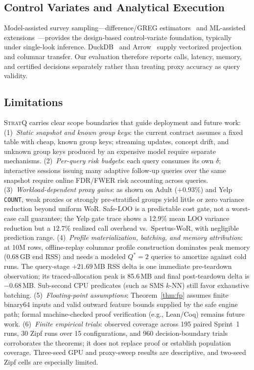 \subsection{Control Variates and Analytical Execution}
Model-assisted survey sampling---difference/GREG estimators~\cite{sarndal1992model} and ML-assisted extensions~\cite{breidt2017modelassisted}---provides the design-based control-variate foundation, typically under single-look inference. DuckDB~\cite{raasveldt2019duckdb} and Arrow~\cite{apachearrow} supply vectorized projection and columnar transfer. Our evaluation therefore reports calls, latency, memory, and certified decisions separately rather than treating proxy accuracy as query validity.

\subsection{Limitations}
\label{sec:limitations}

\textsc{StratQ} carries clear scope boundaries that guide deployment and future work:
(1)~\emph{Static snapshot and known group keys}: the current contract assumes a fixed table with cheap, known group keys; streaming updates, concept drift, and unknown group keys produced by an expensive model require separate mechanisms.
(2)~\emph{Per-query risk budgets}: each query consumes its own $\delta$; interactive sessions issuing many adaptive follow-up queries over the same snapshot require online FDR/FWER risk accounting across queries.
(3)~\emph{Workload-dependent proxy gains}: as shown on Adult ($+0.93\%$) and Yelp \texttt{COUNT}, weak proxies or strongly pre-stratified groups yield little or zero variance reduction beyond uniform WoR. Safe-LOO is a predictable cost gate, not a worst-case call guarantee; the Yelp gate trace shows a 12.9\% mean LOO variance reduction but a $12.7\%$ realized call overhead vs.\ Spertus-WoR, with negligible prediction range.
(4)~\emph{Profile materialization, batching, and memory attribution}: at 10M rows, offline-replay columnar profile construction dominates peak memory (0.68\,GB end RSS) and needs a modeled $Q^*=2$ queries to amortize against cold runs. The query-stage $+21.69$\,MB RSS delta is one immediate pre-teardown observation; its traced-allocation peak is 85.6\,MB and final post-teardown delta is $-0.68$\,MB. Sub-second CPU predicates (such as SMS $k$-NN) still favor exhaustive batching.
(5)~\emph{Floating-point assumptions}: Theorem~\ref{thm:fp} assumes finite binary64 inputs and valid outward feature bounds supplied by the safe engine path; formal machine-checked proof verification (e.g., Lean/Coq) remains future work.
(6)~\emph{Finite empirical trials}: observed coverage across 195 paired Sprint~1 runs, 30 Zipf runs over 15 configurations, and 960 decision-boundary trials corroborates the theorems; it does not replace proof or establish population coverage. Three-seed GPU and proxy-sweep results are descriptive, and two-seed Zipf cells are especially limited.

